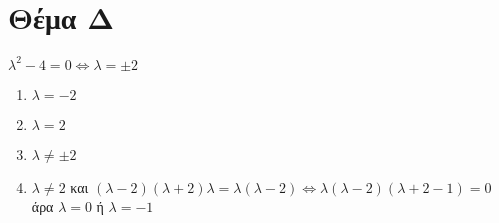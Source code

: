 \documentclass[12pt]{article}
\begin{document}
\section*{Θέμα Δ}
  \noindent
  $λ^2-4=0 \Leftrightarrow λ=\pm 2$
  \begin{enumerate}
    \item $λ=-2$
    \item $λ=2$
    \item $λ\ne \pm 2$
    \item $λ\ne 2$ και $(λ-2)(λ+2)λ=λ(λ-2)\Leftrightarrow λ(λ-2)(λ+2-1)=0$ άρα
    $λ=0$ ή $λ=-1$
  \end{enumerate}

\vspace{3\baselineskip}
\end{document}
